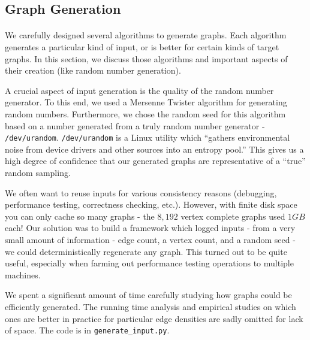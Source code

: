 \subsection{Graph Generation}
\label{sec:deep:graphgen}
\paragraph{}
We carefully designed several algorithms to generate graphs.  Each algorithm
generates a particular kind of input, or is better for certain kinds of target
graphs.  In this section, we discuss those algorithms and important aspects of
their creation (like random number generation).

A crucial aspect of input generation is the quality of the random number
generator.  To this end, we used a Mersenne Twister algorithm for generating
random numbers.  Furthermore, we chose the random seed for this algorithm based
on a number generated from a truly random number generator -
\texttt{/dev/urandom}.  \texttt{/dev/urandom} is a Linux utility which ``gathers
environmental noise from device drivers and other sources into an entropy
pool.''  This gives us a high degree of confidence that our generated graphs are
representative of a ``true'' random sampling.

We often want to reuse inputs for various consistency reasons (debugging,
performance testing, correctness checking, etc.).  However, with finite disk
space you can only cache so many graphs - the $8,192$ vertex complete graphs
used $1GB$ each!  Our solution was to build a framework which logged inputs -
from a very small amount of information - edge count, a vertex count, and a
random seed - we could deterministically regenerate any graph.  This turned out
to be quite useful, especially when farming out performance testing operations
to multiple machines.

We spent a significant amount of time carefully studying how graphs could be
efficiently generated.  The running time analysis and empirical studies on which
ones are better in practice for particular edge densities are sadly omitted for
lack of space.  The code is in \texttt{generate\_input.py}.

